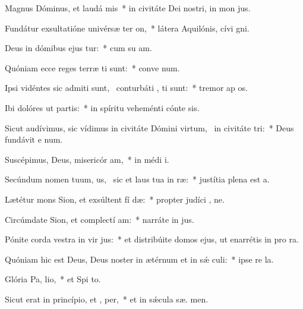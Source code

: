 \item Magnus Dóminus, et laudá mis~* in civitáte Dei nostri, in mon  jus.
\item Fundátur exsultatióne univérsæ ter  on,~* látera Aquilónis, cívi  gni.
\item Deus in dómibus ejus tur:~* cum su am.
\item Quóniam ecce reges terræ ti sunt:~* conve  num.
\item Ipsi vidéntes sic admiti sunt,~\pscross{} conturbáti , ti sunt:~* tremor ap os.
\item Ibi dolóres ut partis:~* in spíritu veheménti cónte  sis.
\item Sicut audívimus, sic vídimus in civitáte Dómini virtum,~\pscross{} in civitáte  tri:~* Deus fundávit e  num.
\item Suscépimus, Deus, misericór am,~* in médi  i.
\item Secúndum nomen tuum, us,~\pscross{} sic et laus tua in  ræ:~* justítia plena est  a.
\item Lætétur mons Sion, et exsúltent fí dæ:~* propter judíci , ne.
\item Circúmdate Sion, et complectí am:~* narráte in  jus.
\item Pónite corda vestra in vir jus:~* et distribúite domos ejus, ut enarrétis in pro ra.
\item Quóniam hic est Deus, Deus noster in ætérnum et in sǽ culi:~* ipse re   la.
\item Glória Pa,  lio,~* et Spi to.
\item Sicut erat in princípio, et ,  per,~* et in sǽcula sæ. men.
